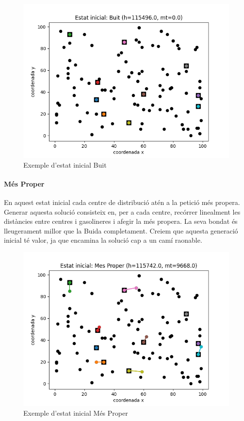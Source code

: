 \documentclass[a4paper]{article}
\begin{document}
\begin{figure}[th]
\centering
\includegraphics[scale=0.6]{images/fig3.png}
\caption{Exemple d'estat inicial Buit}
\end{figure}

\paragraph{Més Proper}
En aquest estat inicial cada centre de distribució atén a la petició més propera. Generar aquesta solució consisteix en, per a cada centre, recórrer linealment les distàncies entre centres i gasolineres i afegir la més propera. La seva bondat és lleugerament millor que la Buida completament. Creiem que aquesta generació inicial té valor, ja que encamina la solució cap a un camí raonable.

\begin{figure}[th]
\centering
\includegraphics[scale=0.6]{images/fig4.png}
\caption{Exemple d'estat inicial Més Proper}
\end{figure}
\end{document}

